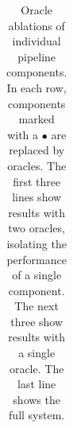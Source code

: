\begin{table}[t]
\begin{tabular}{@{}lrrr}
  \end{tabular}
  \caption{Oracle ablations of individual pipeline components. In each row, components marked with a $\bullet$ are replaced by oracles. The first three lines show results with two oracles, isolating the performance of a single \sysname component. The next three show results with a single oracle. The last line shows the full \sysname system. }
  \label{tbl:pipeline_components}



\end{table}